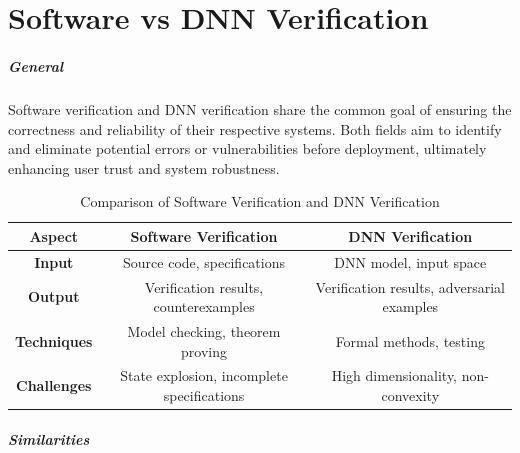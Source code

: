 \documentclass[oneside,11pt,dvipsnames]{book}
\numberwithin{equation}{section}
\theoremstyle{definition}
\theoremstyle{remark}
\begin{document}






\chapter{Software vs DNN Verification}\label{app:software-vs-dnn}


\paragraph{General}
Software verification and DNN verification share the common goal of ensuring the correctness and reliability of their respective systems. Both fields aim to identify and eliminate potential errors or vulnerabilities before deployment, ultimately enhancing user trust and system robustness.

\begin{table}
    \caption{Comparison of Software Verification and DNN Verification}
\begin{tabular}{|c|c|c|}
    \hline
    \textbf{Aspect} & \textbf{Software Verification} & \textbf{DNN Verification} \\
    \hline
    \textbf{Input} & Source code, specifications & DNN model, input space \\
    \hline
    \textbf{Output} & Verification results, counterexamples & Verification results, adversarial examples \\
    \hline
    \textbf{Techniques} & Model checking, theorem proving & Formal methods, testing \\
    \hline
    \textbf{Challenges} & State explosion, incomplete specifications & High dimensionality, non-convexity \\
    \hline
\end{tabular}
\end{table}

\paragraph{Similarities} 
\end{document}
